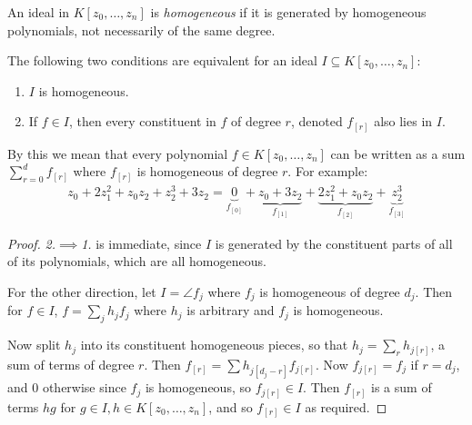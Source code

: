 \documentclass[10pt,a4paper,rgb]{article}
\begin{document}
An ideal in $K[z_0, \ldots, z_n]$ is \emph{homogeneous} if it is generated by homogeneous polynomials, not necessarily of the same degree.
\begin{lemma}
The following two conditions are equivalent for an ideal $I \subseteq K[z_0, \ldots, z_n]$:
\begin{enumerate}
\item $I$ is homogeneous.
\item If $f \in I$, then every constituent in $f$ of degree $r$, denoted $f_{[r]}$ also lies in $I$.
\end{enumerate}
\end{lemma}
By this we mean that every polynomial $f \in K[z_0, \ldots, z_n]$ can be written as a sum $\sum_{r=0}^d f_{[r]}$ where $f_{[r]}$ is homogeneous of degree $r$. For example:
\begin{align*}
z_0 + 2z_1^2 + z_0z_2 + z_2^3 + 3z_2 = \underbrace{0}_{f_{[0]}} + \underbrace{z_0 + 3z_2}_{f_{[1]}} + \underbrace{2z_1^2 + z_0z_2}_{f_{[2]}} + \underbrace{z_2^3}_{f_{[3]}}
\end{align*}
\begin{proof}
\textit{2.}$\implies$\textit{1.} is immediate, since $I$ is generated by the constituent parts of all of its polynomials, which are all homogeneous.

For the other direction, let $I = \angle{f_j}$ where $f_j$ is homogeneous of degree $d_j$. Then for $f \in I$, $f = \sum_j h_j f_j$ where $h_j$ is arbitrary and $f_j$ is homogeneous.

Now split $h_j$ into its constituent homogeneous pieces, so that $h_j = \sum_r h_{j[r]}$, a sum of terms of degree $r$. Then $f_{[r]} = \sum h_{j[d_j-r]} f_{j[r]}$. Now $f_{j[r]} = f_j$ if $r = d_j$, and $0$ otherwise since $f_j$ is homogeneous, so $f_{j[r]} \in I$. Then $f_{[r]}$ is a sum of terms $hg$ for $g \in I, h \in K[z_0, \ldots, z_n]$, and so $f_{[r]} \in I$ as required.
\end{proof}
\end{document}
